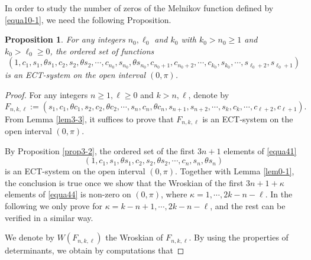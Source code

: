 \documentclass[11pt]{amsart}
\newtheorem{prop}[thm]{Proposition}
\theoremstyle{remark}
\theoremstyle{definition}
\begin{document}
In order to study the number of zeros of  the Melnikov function defined by \eqref{equa10-1}, we need the following Proposition.
\begin{prop} \label{prop3-3} For any   integers   $n_0, \ell_0$ and $k_0$ with $k_0>n_0\geq 1$ and $k_0>\ell_0\geq 0$, the  ordered set of functions
\begin{equation} \label{equa41} (1, c_1, s_1,\theta s_1,  c_2, s_2, \theta s_2,\cdots, c_{n_0}, s_{n_0}, \theta s_{n_0},
  c_{n_0+1},  c_{n_0+2}, \cdots, c_{k_0}, s_{k_0},\cdots, s_{\ell_0+2}, s_{\ell_0+1})
\end{equation}
is an ECT-system on the open interval  $(0, \pi)$.
\end{prop}


\begin{proof}


 For any integers  $n\geq 1, \ell\geq 0$ and $k>n, \ell$, denote by
\begin{equation} \label{equa44} F_{n, k,\ell}:=(s_1, c_1,  \theta c_1, s_2, c_2, \theta c_2,\cdots, s_{n}, c_{n}, \theta c_{n},
s_{n+1},  s_{n+2},\cdots, s_{k}, c_{k},   \cdots, c_{\ell+2}, c_{\ell+1} ).
 \end{equation}
From Lemma \ref{lem3-3}, it suffices to prove that $F_{n, k,\ell}$
is an ECT-system on the open interval  $(0, \pi)$.

By Proposition  \ref{prop3-2}, the ordered set of the first $3n+1$ elements of  \eqref{equa41}
\begin{equation*} \label{equa42} (1, c_1, s_1,\theta s_1,  c_2, s_2, \theta s_2,\cdots, c_{n}, s_{n}, \theta s_{n})
\end{equation*}
is an ECT-system on the open interval  $(0, \pi)$. Together with Lemma \ref{lem0-1}, the conclusion is true once we show that
the  Wroskian of the first $3n+1+\kappa$ elements of \eqref{equa44} is non-zero on $(0, \pi)$, where $\kappa=1,\cdots,2k-n-\ell$.
In the following we only prove for $\kappa=k-n+1, \cdots, 2k-n-\ell$, and the rest can be verified in a similar way.




We denote by $W(F_{n,k,\ell})$ the Wroskian of $F_{n,k,\ell}$. By using the  properties of determinants, we obtain by computations that




\end{proof}
\end{document}
